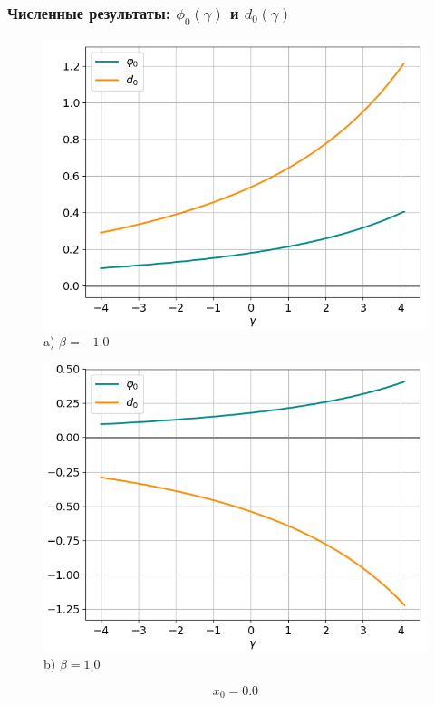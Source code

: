 \documentclass[fullscreen=true, unicode, bookmarks=false]{beamer}
\begin{document}
\begin{frame}
\frametitle{ Численные результаты: $ \phi_0(\gamma) $ и $ d_0(\gamma) $ }

\begin{figure} 
\begin{minipage}[h]{0.49\linewidth}
\begin{center}
\includegraphics[scale=0.33]{oscillating_phi0d0_x0=0,0,beta=-1,0.png} \\ {\scriptsize a) $ \beta = -1.0 $}
\end{center}
\end{minipage} 
\hfill
\begin{minipage}[h]{0.49\linewidth}
\begin{center}
\includegraphics[scale=0.33]{oscillating_phi0d0_x0=0,0_beta=1,0.png}  \\ {\scriptsize b) $ \beta = 1.0 $}
\end{center}
\end{minipage} 
\end{figure}

$$ x_0 = 0.0 $$

\end{frame}
\end{document}
